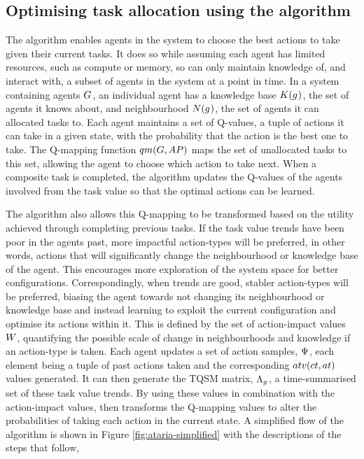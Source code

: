 \subsection{Optimising task allocation using the \acronymATARIA{}{} algorithm}
\label{section:solution_ataria}

The \acronymATARIA{}{} algorithm enables agents in the system to choose the best actions to take given their current tasks. It does so while assuming each agent has limited resources, such as compute or memory, so can only maintain knowledge of,  and interact with,  a subset of agents in the system at a point in time. In a system containing agents $G_{}^{}$, an individual agent has a knowledge base $\functionKnowledgeSignature{}{}$, the set of agents it knows about, and neighbourhood $\functionNeighbourhoodSignature{}{}$, the set of agents it can allocated tasks to. Each agent maintains a set of Q-values, a tuple of actions it can take in a given state, with the probability that the action is the best one to take. The  Q-mapping function $\functionQMappingSignature{}{}$ maps the set of unallocated tasks to this set, allowing the agent to choose which action to take next. When a composite task is completed, the algorithm updates the Q-values of the agents involved from the task value so that the optimal actions can be learned.

The \acronymATARIA{}{} algorithm also allows this Q-mapping to be transformed based on the utility achieved through completing previous tasks. If the task value trends have been poor in the agents past, more impactful action-types will be preferred, in other words, actions that will significantly change the neighbourhood or knowledge base of the agent. This encourages more exploration of the system space for better configurations. Correspondingly, when trends are good, stabler action-types will be preferred, biasing the agent towards not changing its neighbourhood or knowledge base and instead learning to exploit the current configuration and optimise its actions within it. This is defined by the set of action-impact values $\setRiskAction{}{}$, quantifying  the possible scale of change in neighbourhoods and knowledge if an action-type is taken. Each agent updates a set of action samples, $\setActionSample{}{}$, each element being a tuple of past actions taken and the corresponding $\functionTaskAbsoluteValue{}{}$ values generated. It can then generate the TQSM matrix, $\setRewardSet{\varAgent{}{}}{}$, a time-summarised set of these task value trends. By using these values in combination with the action-impact values, \acronymATARIA{}{} then transforms the Q-mapping values to alter the probabilities of taking each action in the current state. A simplified flow of the \acronymATARIA{}{} algorithm is shown in Figure \ref{fig:ataria-simplified} with the descriptions of the steps that follow,

